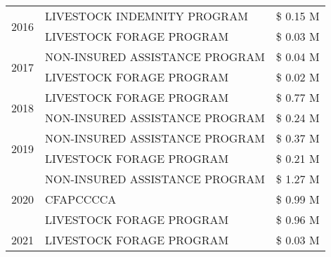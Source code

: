 \begin{tabular}{llr}
\cline{1-3}
\multirow[t]{2}{*}{2016} & LIVESTOCK INDEMNITY PROGRAM & \$ 0.15 M \\
 & LIVESTOCK FORAGE PROGRAM & \$ 0.03 M \\
\cline{1-3}
\multirow[t]{2}{*}{2017} & NON-INSURED ASSISTANCE PROGRAM & \$ 0.04 M \\
 & LIVESTOCK FORAGE PROGRAM & \$ 0.02 M \\
\cline{1-3}
\multirow[t]{2}{*}{2018} & LIVESTOCK FORAGE PROGRAM & \$ 0.77 M \\
 & NON-INSURED ASSISTANCE PROGRAM & \$ 0.24 M \\
\cline{1-3}
\multirow[t]{2}{*}{2019} & NON-INSURED ASSISTANCE PROGRAM & \$ 0.37 M \\
 & LIVESTOCK FORAGE PROGRAM & \$ 0.21 M \\
\cline{1-3}
\multirow[t]{3}{*}{2020} & NON-INSURED ASSISTANCE PROGRAM & \$ 1.27 M \\
 & CFAPCCCCA & \$ 0.99 M \\
 & LIVESTOCK FORAGE PROGRAM & \$ 0.96 M \\
\cline{1-3}
2021 & LIVESTOCK FORAGE PROGRAM & \$ 0.03 M \\
\cline{1-3}
\bottomrule
\end{tabular}
